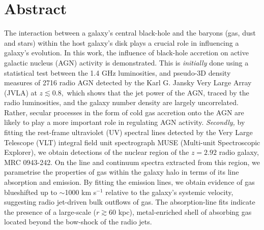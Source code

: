 
\chapter*{Abstract}

The interaction between a galaxy's central black-hole and the baryons (gas, dust and stars) within the host galaxy's disk plays a crucial role in influencing a galaxy's evolution. In this work, the influence of black-hole accretion on active galactic nucleus (AGN) activity is demonstrated. This is {\it initially} done using a statistical test between the 1.4 GHz luminosities, and pseudo-3D density measures of 2716 radio AGN detected by the Karl G. Jansky Very Large Array (JVLA) at $z \lesssim 0.8,$ which shows that the jet power of the AGN, traced by the radio luminosities, and the galaxy number density are largely uncorrelated. Rather, secular processes in the form of cold gas accretion onto the AGN are likely to play a more important role in regulating AGN activity. {\it Secondly,} by fitting the rest-frame ultraviolet (UV) spectral lines detected by the Very Large Telescope (VLT) integral field unit spectrograph MUSE (Multi-unit Spectroscopic Explorer), we obtain detections of the nuclear region of the $z=2.92$ radio galaxy, MRC 0943-242. On the line and continuum spectra extracted from this region, we parametrise the properties of gas within the galaxy halo in terms of its line absorption and emission. By fitting the emission lines, we obtain evidence of gas blueshifted up to $\sim$1000 km s$^{-1}$ relative to the galaxy's systemic velocity, suggesting radio jet-driven bulk outflows of gas. The absorption-line fits indicate the presence of a large-scale ($r \gtrsim 60$ kpc), metal-enriched shell of absorbing gas located beyond the bow-shock of the radio jets. 
